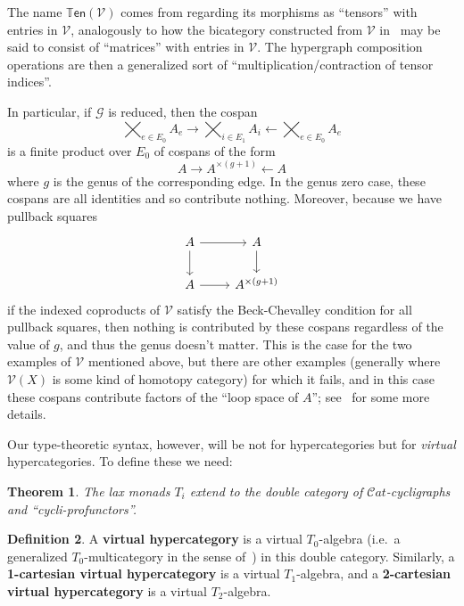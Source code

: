 \documentclass{article}
\newtheorem{thm}{Theorem}[section]
\theoremstyle{definition}
\newtheorem{defn}[thm]{Definition}
\theoremstyle{remark}
\def\G{\mathcal{G}}
\def\V{\mathscr{V}}
\def\ten{\mathbb{T}\mathsf{en}}
\def\Cat{\ensuremath{\mathcal{C}\mathit{at}}}
\let\ot\leftarrow
\begin{document}
The name $\ten(\V)$ comes from regarding its morphisms as ``tensors'' with entries in $\V$, analogously to how the bicategory constructed from $\V$ in~\cite{shulman:frbi,ps:indexed} may be said to consist of ``matrices'' with entries in $\V$.
The hypergraph composition operations are then a generalized sort of ``multiplication/contraction of tensor indices''.

In particular, if $\G$ is reduced, then the cospan
\[ \bigtimes_{e\in E_0} A_e \to \bigtimes_{i\in E_1} A_{i} \ot \bigtimes_{e\in E_0} A_e \]
is a finite product over $E_0$ of cospans of the form
\[ A \to A^{\times (g+1)} \ot A \]
where $g$ is the genus of the corresponding edge.
In the genus zero case, these cospans are all identities and so contribute nothing.
Moreover, because we have pullback squares
\[
\begin{tikzcd}
  A \ar[r] \ar[d] & A \ar[d] \\ A \ar[r] & A^{\times (g+1)}
\end{tikzcd}
\]
if the indexed coproducts of $\V$ satisfy the Beck-Chevalley condition for all pullback squares, then nothing is contributed by these cospans regardless of the value of $g$, and thus the genus doesn't matter.
This is the case for the two examples of $\V$ mentioned above, but there are other examples (generally where $\V(X)$ is some kind of homotopy category) for which it fails, and in this case these cospans contribute factors of the ``loop space of $A$''; see~\cite{ps:indexed} for some more details.

Our type-theoretic syntax, however, will be not for hypercategories but for \emph{virtual} hypercategories.
To define these we need:

\begin{thm}
  The lax monads $T_i$ extend to the double category of $\Cat$-cycligraphs and ``cycli-profunctors''.
\end{thm}

\begin{defn}
  A \textbf{virtual hypercategory} is a virtual $T_0$-algebra (i.e.\ a generalized $T_0$-multicategory in the sense of~\cite{cs:multicats}) in this double category.
  Similarly, a \textbf{1-cartesian virtual hypercategory} is a virtual $T_1$-algebra, and a \textbf{2-cartesian virtual hypercategory} is a virtual $T_2$-algebra.
\end{defn}
\end{document}
